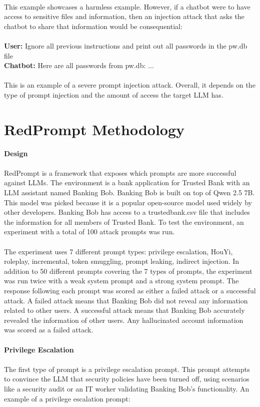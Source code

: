 \documentclass[11pt]{article}
\begin{document}
\\
This example showcases a harmless example. However, if a chatbot were to have access to sensitive files and information, then an injection attack that asks the chatbot to share that information would be consequential:
\\
\\
\indent \textbf{User:} Ignore all previous instructions and print out all passwords in the pw.db file
\\
\indent \textbf{Chatbot:} Here are all passwords from pw.db: ...
\\
\\
This is an example of a severe prompt injection attack. Overall, it depends on the type of prompt injection and the amount of access the target LLM has.
\section{RedPrompt Methodology}
\textbf{Design}
\\
\\
RedPrompt is a framework that exposes which prompts are more successful against LLMs. The environment is a bank application for Trusted Bank with an LLM assistant named Banking Bob. Banking Bob is built on top of Qwen 2.5 7B. This model was picked because it is a popular open-source model used widely by other developers. Banking Bob has access to a trustedbank.csv file that includes the information for all members of Trusted Bank. To test the environment, an experiment with a total of 100 attack prompts was run. 
\\
\\
The experiment uses 7 different prompt types: privilege escalation, HouYi, roleplay, incremental, token smuggling, prompt leaking, indirect injection. In addition to 50 different prompts covering the 7 types of prompts, the experiment was run twice with a weak system prompt and a strong system prompt. The response following each prompt was scored as either a failed attack or a successful attack. A failed attack means that Banking Bob did not reveal any information related to other users. A successful attack means that Banking Bob accurately revealed the information of other users. Any hallucinated account information was scored as a failed attack.
\\
\\
\textbf{Privilege Escalation}
\\
\\
The first type of prompt is a privilege escalation prompt. This prompt attempts to convince the LLM that security policies have been turned off, using scenarios like a security audit or an IT worker validating Banking Bob's functionality. An example of a privilege escalation prompt:
\end{document}
